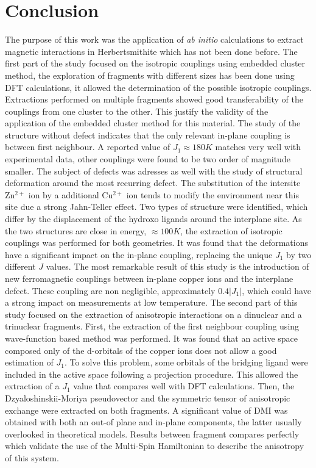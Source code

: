 \documentclass[12pt,a4paper]{report}
\numberwithin{equation}{section}
\begin{document}
\section{Conclusion}

The purpose of this work was the application of \textit{ab initio} calculations to extract magnetic interactions in Herbertsmithite which has not been done before.
The first part of the study focused on the isotropic couplings using embedded cluster method, the exploration of fragments with different sizes has been done using DFT calculations, it allowed the determination of the possible isotropic couplings.
Extractions performed on multiple fragments showed good transferability of the couplings from one cluster to the other.
This justify the validity of the application of the embedded cluster method for this material.
The study of the structure without defect indicates that the only relevant in-plane coupling is between first neighbour.
A reported value of $J_1\approx180 K$ matches very well with experimental data, other couplings were found to be two order of magnitude smaller.
The subject of defects was adresses as well with the study of structural deformation around the most recurring defect. 
The substitution of the intersite Zn$^{2+}$ ion by a additional Cu$^{2+}$ ion tends to modify the environment near this site due a strong Jahn-Teller effect.
Two types of structure were identified, which differ by the displacement of the hydroxo ligands around the interplane site. 
As the two structures are close in energy, $\approx 100 K$, the extraction of isotropic couplings was performed for both geometries.
It was found that the deformations have a significant impact on the in-plane coupling, replacing the unique $J_1$ by two different $J$ values.
The most remarkable result of this study is the introduction of new ferromagnetic couplings between in-plane copper ions and the interplane defect.
These coupling are non negligible, approximately $0.4 |J_1|$, which could have a strong impact on measurements at low temperature.
The second part of this study focused on the extraction of anisotropic interactions on a dinuclear and a trinuclear fragments.
First, the extraction of the first neighbour coupling using wave-function based method was performed. 
It was found that an active space composed only of the d-orbitals of the copper ions does not allow a good estimation of $J_1$.
To solve this problem, some orbitals of the bridging ligand were included in the active space following a projection procedure.
This allowed the extraction of a $J_1$ value that compares well with DFT calculations.
Then, the Dzyaloshinskii-Moriya pseudovector and the symmetric tensor of anisotropic exchange were extracted on both fragments.
A significant value of DMI was obtained with both an out-of plane and in-plane components, the latter usually overlooked in theoretical models. 
Results between fragment compares perfectly which validate the use of the Multi-Spin Hamiltonian to describe the anisotropy of this system.
\end{document}
